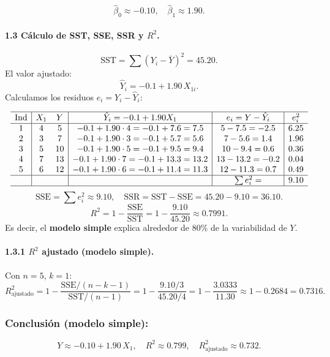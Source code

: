 \documentclass[10pt,a4paper]{article}
\begin{document}
\begin{enumerate}
\[
\boxed{
\widehat{\beta}_0 \approx -0.10,
\quad
\widehat{\beta}_1 \approx 1.90.
}
\]

\paragraph{1.3 C\'alculo de SST, SSE, SSR y $R^2$.}

\[
\text{SST}
= \sum (Y_i - \bar{Y})^2
= 45.20.
\]
El valor ajustado: 
\[
\hat{Y}_i
= -0.1 +1.90\,X_{1i}.
\]
Calculamos los residuos $e_i = Y_i - \hat{Y}_i$:

\[
\begin{array}{c|cc|c|c|c}
\hline
\text{Ind} & X_1 & Y 
& \hat{Y}_i = -0.1 +1.90X_1
& e_i= Y-\hat{Y}_i
& e_i^2
\\\hline
1 & 4 & 5 
& -0.1 +1.90\cdot4 =-0.1 +7.6=7.5
& 5-7.5=-2.5
& 6.25
\\
2 & 3 &7
& -0.1 +1.90\cdot3 =-0.1 +5.7=5.6
& 7-5.6=1.4
& 1.96
\\
3 & 5 &10
& -0.1 +1.90\cdot5 =-0.1 +9.5=9.4
& 10-9.4=0.6
& 0.36
\\
4 & 7 &13
& -0.1 +1.90\cdot7 =-0.1 +13.3=13.2
& 13-13.2=-0.2
& 0.04
\\
5 & 6 &12
& -0.1 +1.90\cdot6 =-0.1 +11.4=11.3
& 12-11.3=0.7
& 0.49
\\
\hline
& & & & \sum e_i^2= & 9.10
\\\hline
\end{array}
\]
\[
\text{SSE} = \sum e_i^2 \approx 9.10,
\quad
\text{SSR} = \text{SST} - \text{SSE} = 45.20 -9.10=36.10.
\]
\[
R^2
= 1 - \frac{\text{SSE}}{\text{SST}}
= 1 - \frac{9.10}{45.20}
\approx 0.7991.
\]
Es decir, el \textbf{modelo simple} explica alrededor de $80\%$ de la variabilidad de $Y$.

\paragraph{1.3.1 $R^2$ ajustado (modelo simple).}

Con $n=5$, $k=1$:
\[
R_{\text{ajustado}}^2
= 1 - \frac{\text{SSE}/(n - k -1)}{\text{SST}/(n-1)}
= 1 - \frac{9.10/3}{45.20/4}
= 1 - \frac{3.0333}{11.30}
\approx 1 -0.2684
= 0.7316.
\]

\subsubsection*{Conclusi\'on (modelo simple):}
\[
Y \approx -0.10 +1.90\,X_1,
\quad
R^2 \approx 0.799,
\quad
R_{\text{ajustado}}^2 \approx 0.732.
\]


\end{enumerate}
\end{document}
